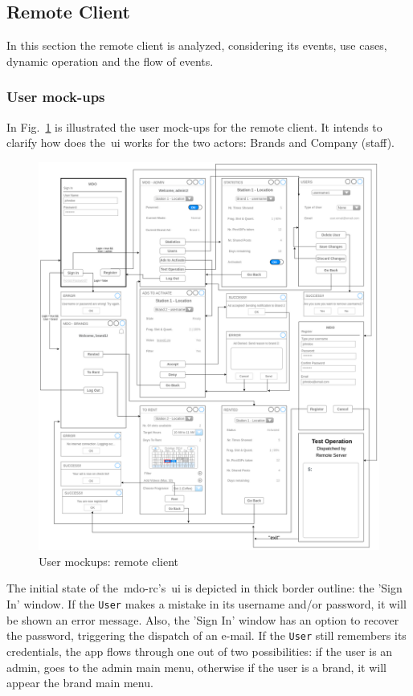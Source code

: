 %
\subsection{Remote Client}
\label{sec:remote-cli-decomp}
%
In this section the remote client is analyzed, considering its events, use cases, dynamic operation and the flow of events.

\subsubsection{User mock-ups}
\label{sec:user-mockups-1}
%
In Fig.~\ref{fig:user-mockups-rc} is illustrated the user mock-ups for the remote client. 
It intends to clarify how does the~\gls{ui} works for the two actors:
Brands and Company (staff).
%
\begin{figure}[htb!]
\centering
    \includegraphics[width=1.0\columnwidth]{./img/user-mockups-rc.png}
  \caption{User mockups: remote client}%
\label{fig:user-mockups-rc}
\end{figure}

The initial state of the~\gls{mdo-rc}'s~\gls{ui} is depicted in thick border outline: the 'Sign In' window. 
If the \texttt{User} makes a mistake in its username and/or password, it will be shown an error message. 
Also, the 'Sign In' window has an option to recover the password, triggering the
dispatch of an e-mail.
If the \texttt{User} still remembers its credentials, the app flows through one
out of two possibilities: if the user is an admin, goes to the admin main menu,
otherwise if the user is a brand, it will appear the brand main menu.

